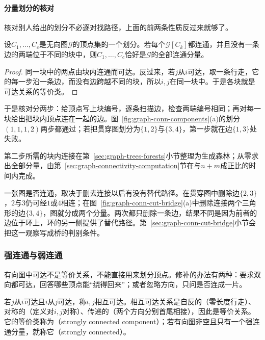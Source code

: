 \paragraph{分量划分的核对}
核对别人给出的划分不必逐对找路径，上面的前两条性质反过来就够了。

\begin{lemma}[分量划分的核对]
\label{lem:graph-conn-component-check}
设$C_1,\ldots,C_c$是无向图$\mathcal G$的顶点集的一个划分。若每个$\mathcal G[C_k]$都连通，并且没有一条边的两端位于不同的块中，则$C_1,\ldots,C_c$恰好是$\mathcal G$的全部连通分量。
\end{lemma}

\begin{proof}
同一块中的两点由块内连通而可达。反过来，若$j$从$i$可达，取一条行走，它的每一步沿一条边，而没有边跨越不同的块，所以$i,j$在同一块中。于是各块就是可达关系的等价类。
\end{proof}

于是核对分两步：给顶点写上块编号，逐条扫描边，检查两端编号相同；再对每一块给出把块内顶点连在一起的边。图~\ref{fig:graph-conn-components}(a)的划分$(1,1,1,2)$两步都通过；若把贯穿图划分为$\{1,2\}$与$\{3,4\}$，第一步就在边$\{1,3\}$处失败。

第二步所需的块内连接在第~\ref{sec:graph-trees-forests}小节整理为生成森林；从零求出全部分量，由第~\ref{sec:graph-connectivity-computation}节在与$n+m$成正比的时间内完成。

一张图是否连通，取决于删去连接以后有没有替代路径。在贯穿图中删除边$\{2,3\}$，$2$与$3$仍可经$1$或$4$相连；在图~\ref{fig:graph-conn-cut-bridge}(a)中删除连接两个三角形的边$\{3,4\}$，图就分成两个分量。两次都只删除一条边，结果不同是因为前者的边位于环上，环的另一侧提供了替代路径。第~\ref{sec:graph-conn-cut-bridge}小节会把这一观察写成桥的判别条件。

\subsubsection{强连通与弱连通}
\label{sec:graph-conn-strong-weak}

有向图中可达不是等价关系，不能直接用来划分顶点。修补的办法有两种：要求双向都可达，回答哪些顶点能“绕得回来”；或者忽略方向，只问是否连成一片。

若$j$从$i$可达且$i$从$j$可达，称$i,j$相互可达。相互可达关系是自反的（零长度行走）、对称的（定义对$i,j$对称）、传递的（两个方向分别首尾相接），因此是等价关系。它的等价类称为（strongly connected component）；若有向图非空且只有一个强连通分量，就称它（strongly connected）。

